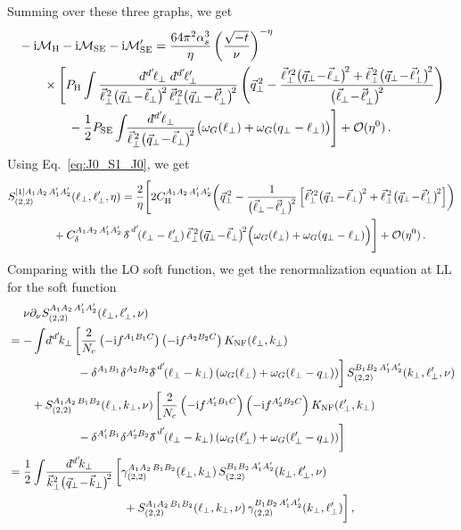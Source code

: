 \documentclass[letterpaper,11pt]{article}
\newcommand{\eq}[1]{Eq.~\eqref{eq:#1}}
\newcommand{\img}{\mathrm{i}}
\newcommand{\w}{\omega}
\newcommand{\cM}{\mathcal{M}}
\newcommand{\cO}{\mathcal{O}}
\newcommand{\deltaslash}{{\delta\!\!\!{}^-}}
\newcommand{\as}{\alpha_s}
\newcommand{\nn}{\nonumber}
\newcommand\prp[1]{\vec #1_\perp}
\newcommand\prpsqm[2]{\bigl( \prp{#1} \!-\! \prp{#2} \bigr)^{\!2}}
\newcommand\prnth[1]{\left(#1\right)}
\newcommand{\dbar}{d\hspace*{-0.08em}\bar{}\hspace*{0.1em}}
\begin{document}
Summing over these three graphs, we get
\begin{align}
  & -\img\cM_{\rm{H}}-\img\cM_{\rm{SE}}-\img\cM_{\rm{SE}}' =\color{black} \frac{64 \pi^2 \as^3 }{\eta }\left(\frac{\sqrt{-t}}{\nu}\right)^{-\eta}  \nn\\ 
    &\qquad \times\Biggl[ P_{\rm H}\int\frac{\dbar^{d'}\!\ell_\perp \; \dbar^{d'}\!\ell_\perp'  }{
      \vec\ell_\perp^{\,2} \prpsqm{q}{\ell}\, \vec\ell^{\prime2}_\perp \prpsqm{q}{\ell'}
      }
      \left(\vec q_\perp^{\,2} - \frac{\vec\ell^{\,\prime2}_\perp \prpsqm{q}{\ell} + \vec\ell_\perp^{\,2} \prpsqm{q}{\ell^{\,\prime}}}{\prpsqm{\ell}{\ell'}}  \right)
    \nn\\
  &\qquad\qquad -\frac12 P_\text{SE}
\int\!\!\frac{\dbar^{d'}\!\ell_\perp}{
\vec\ell_\perp^{\,2} \prpsqm{q}{\ell}
} \bigl(\w_G(\ell_\perp)+\w_G(q_\perp-\ell_\perp)\bigr)\Biggr] + \mathcal{O}(\eta^0)\,.
\end{align}
%
Using \eq{J0_S1_J0}, we get
\begin{align}
  &S^{[1]A_1 A_2\, A_1' A_2'}_{(2,2)}(\ell_\perp,\ell_\perp',\eta)=\frac{2}{\eta}\Biggl[2 C_{\rm H}^{A_1 A_2\, A_1' A_2'}
  \biggl(\vec q_\perp^{\,2} - \frac1{\prpsqm{\ell}{\ell'}} \left[ \vec\ell^{\,\prime2}_\perp \prpsqm{q}{\ell} + \vec\ell_\perp^{\,2} \prpsqm{q}{\ell^{\,\prime}} \right] \biggr)
  \nn\\
  &\qquad\qquad + C_\delta^{A_1 A_2\, A_1' A_2'}\, \deltaslash^{d'}\!(\ell_\perp-\ell_\perp') \,
  \vec\ell_\perp^{\;2} \prpsqm{q}{\ell}
  \Bigl(\w_G(\ell_\perp)+\w_G(q_\perp-\ell_\perp)\Bigr)\Biggr]
  +\cO(\eta^0)\,.
\end{align}
Comparing with the LO soft function, we get the renormalization equation at LL for the soft function
\begin{align}
  &\quad~ \nu\partial_\nu S^{A_1 A_2\, A_1' A_2'}_{(2,2)}(\ell_\perp,\ell_\perp',\nu)\nn\\
  &= -\int\! \dbar^{d'}\!k_\perp\, 
      \biggl[ \frac2{N_c}\prnth{-\img f^{A_1B_1C}} \prnth{-\img f^{A_2B_2C}} K_\text{NF}(\ell_\perp, k_\perp)
      \nn \\
  & \qquad\qquad\qquad - \delta^{A_1B_1}\delta^{A_2B_2}  \deltaslash^{d'}\!(\ell_\perp- k_\perp) \prnth{\omega_G(\ell_\perp) + \omega_G(\ell_\perp-q_\perp)} \biggr]\, S^{B_1 B_2\, A_1' A_2'}_{(2,2)}(k_\perp,\ell_\perp',\nu)
     \nn\\
  & \qquad  +S^{A_1 A_2\, B_1 B_2}_{(2,2)}(\ell_\perp,k_\perp,\nu)\, \biggl[ \frac2{N_c}\prnth{-\img f^{A'_1B_1C}} \prnth{-\img f^{A'_2B_2C}} K_\text{NF}(\ell'_\perp, k_\perp)
  \nn \\
& \qquad\qquad\qquad - \delta^{A'_1B_1}\delta^{A'_2B_2}  \deltaslash^{d'}\!(\ell_\perp- k_\perp) \prnth{\omega_G(\ell'_\perp) + \omega_G(\ell'_\perp-q_\perp)} \biggr]\\
  &= \frac12\int\! \frac{\dbar^{d'}\!k_\perp}{\vec k_\perp^2 \prpsqm{q}{k}}\, 
  \biggl[
      \gamma_{(2,2)}^{A_1A_2\,B_1B_2}(\ell_\perp,k_\perp)\,
      S^{B_1 B_2\, A_1' A_2'}_{(2,2)}(k_\perp,\ell_\perp',\nu)
      \nn\\
  &\qquad\qquad\qquad\qquad\qquad  +
      S^{A_1 A_2\, B_1 B_2}_{(2,2)}(\ell_\perp,k_\perp,\nu) \,
      \gamma_{(2,2)}^{B_1B_2\,A'_1A'_2}(k_\perp,\ell'_\perp)  \biggr]
\,,\end{align}
\end{document}
